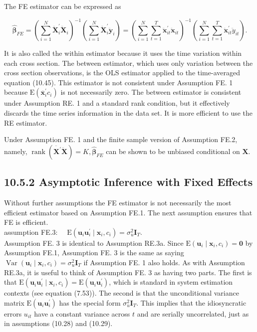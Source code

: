 \documentclass[10pt]{article}
\begin{document}
The FE estimator can be expressed as


\begin{equation*}
\hat{\boldsymbol{\beta}}_{F E}=\left(\sum_{i=1}^{N} \ddot{\mathbf{X}}_{i}^{\prime} \ddot{\mathbf{X}}_{i}\right)^{-1}\left(\sum_{i=1}^{N} \ddot{\mathbf{X}}_{i}^{\prime} \ddot{\mathbf{y}}_{i}\right)=\left(\sum_{i=1}^{N} \sum_{t=1}^{T} \ddot{\mathbf{x}}_{i t}^{\prime} \ddot{\mathbf{x}}_{i t}\right)^{-1}\left(\sum_{i=1}^{N} \sum_{t=1}^{T} \ddot{\mathbf{x}}_{i t}^{\prime} \ddot{y}_{i t}\right) . \tag{10.50}
\end{equation*}


It is also called the within estimator because it uses the time variation within each cross section. The between estimator, which uses only variation between the cross section observations, is the OLS estimator applied to the time-averaged equation (10.45). This estimator is not consistent under Assumption FE. 1 because $\mathrm{E}\left(\overline{\mathbf{x}}_{i}^{\prime} c_{i}\right)$ is not necessarily zero. The between estimator is consistent under Assumption RE. 1 and a standard rank condition, but it effectively discards the time series information in the data set. It is more efficient to use the RE estimator.

Under Assumption FE. 1 and the finite sample version of Assumption FE.2, namely, $\operatorname{rank}\left(\ddot{\mathbf{X}^{\prime}} \ddot{\mathbf{X}}\right)=K, \hat{\boldsymbol{\beta}}_{F E}$ can be shown to be unbiased conditional on $\mathbf{X}$.

\subsection*{10.5.2 Asymptotic Inference with Fixed Effects}
Without further assumptions the FE estimator is not necessarily the most efficient estimator based on Assumption FE.1. The next assumption ensures that FE is efficient.\\
assumption FE.3: $\quad \mathrm{E}\left(\mathbf{u}_{i} \mathbf{u}_{i}^{\prime} \mid \mathbf{x}_{i}, c_{i}\right)=\sigma_{u}^{2} \mathbf{I}_{T}$.\\
Assumption FE. 3 is identical to Assumption RE.3a. Since $\mathrm{E}\left(\mathbf{u}_{i} \mid \mathbf{x}_{i}, c_{i}\right)=\mathbf{0}$ by Assumption FE.1, Assumption FE. 3 is the same as saying $\operatorname{Var}\left(\mathbf{u}_{i} \mid \mathbf{x}_{i}, c_{i}\right)=\sigma_{u}^{2} \mathbf{I}_{T}$ if Assumption FE. 1 also holds. As with Assumption RE.3a, it is useful to think of Assumption FE. 3 as having two parts. The first is that $\mathrm{E}\left(\mathbf{u}_{i} \mathbf{u}_{i}^{\prime} \mid \mathbf{x}_{i}, c_{i}\right)=\mathrm{E}\left(\mathbf{u}_{i} \mathbf{u}_{i}^{\prime}\right)$, which is standard in system estimation contexts (see equation (7.53)). The second is that the unconditional variance matrix $\mathrm{E}\left(\mathbf{u}_{i} \mathbf{u}_{i}^{\prime}\right)$ has the special form $\sigma_{u}^{2} \mathbf{I}_{T}$. This implies that the idiosyncratic errors $u_{i t}$ have a constant variance across $t$ and are serially uncorrelated, just as in assumptions (10.28) and (10.29).
\end{document}
